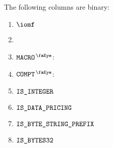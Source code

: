 The following columns are binary:
\begin{multicols}{4}
	\begin{enumerate}
		\item $\iomf$
		\item[\vspace{\fill}]
		\item $\isRlpUtilsMacro$:
		\item $\isRlpUtilsCompt$:
		\item $\texttt{IS\_INTEGER}$
		\item $\texttt{IS\_DATA\_PRICING}$
		\item $\texttt{IS\_BYTE\_STRING\_PREFIX}$
		\item $\texttt{IS\_BYTES32}$
	\end{enumerate}
\end{multicols}
